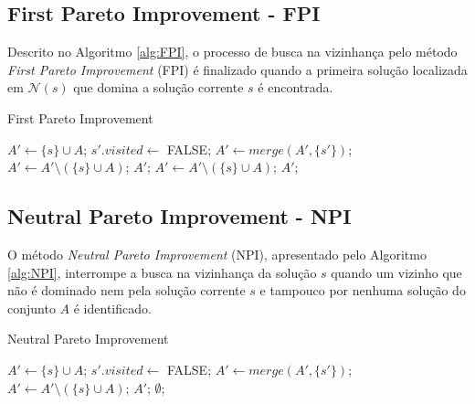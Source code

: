 \documentclass[
	12pt,				%
	openany,			%
	oneside,	
	a4paper,			%
	brazil,				%
	]{unimontes-ppgmsc-abntex2}
\begin{document}
\subsection{First Pareto Improvement - FPI} 

Descrito no Algoritmo \ref{alg:FPI}, o processo de busca na vizinhança pelo método {\em First Pareto Improvement} (FPI) é finalizado quando a primeira solução localizada em $\mathcal{N}(s)$ que domina a solução corrente $s$ é encontrada.

\begin{algorithm}[H]
\caption{First Pareto Improvement}
\label{alg:FPI}
\begin{algorithmic}[1]
\State $A' \leftarrow \{s\} \cup A$;
	\State $s'.visited\leftarrow$ FALSE;
    \State $A' \leftarrow merge(A', \{s'\})$;
      \State $A' \leftarrow A' \setminus (\{s\} \cup A)$;
      \State \Return $A'$;
    \EndIf
  \EndIf
\EndFor
\State $A' \leftarrow A' \setminus (\{s\} \cup A)$;
\State \Return $A'$;
\end{algorithmic}
\end{algorithm}

\subsection{Neutral Pareto Improvement - NPI} 

O método {\em Neutral Pareto Improvement} (NPI), apresentado pelo Algoritmo \ref{alg:NPI}, interrompe a busca na vizinhança da solução $s$ quando um vizinho que não é dominado nem pela solução corrente $s$ e tampouco por nenhuma solução do conjunto $A$ é identificado.

\begin{algorithm}[H]
\caption{Neutral Pareto Improvement}
\label{alg:NPI}
\begin{algorithmic}[1]
\State $A' \leftarrow \{s\} \cup A$;
    \State $s'.visited \leftarrow$ FALSE;
    \State $A' \leftarrow merge(A', \{s'\})$;
    \State $A' \leftarrow A' \setminus (\{s\} \cup A)$;
    \State \Return $A'$;
  \EndIf
\EndFor
\State \Return $\emptyset$;
\end{algorithmic}
\end{algorithm}
\end{document}
